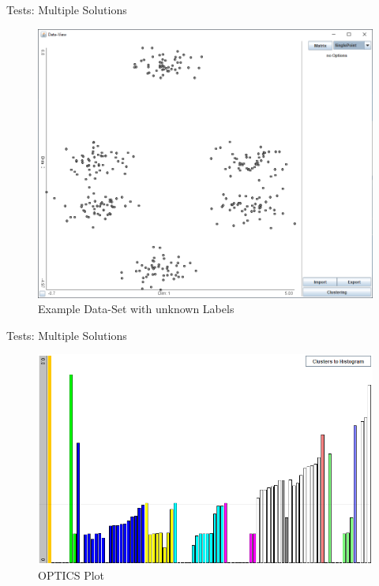 \documentclass[aspectratio=169]{beamer}
\begin{document}
\begin{frame}{Tests: Multiple Solutions}
	\begin{figure}[h]
		\centering
		\includegraphics[width=.64\textwidth]{multi}
		\caption{Example Data-Set with unknown Labels}
		\label{fig:multi}
	\end{figure}
\end{frame}


\begin{frame}{Tests: Multiple Solutions}
	\begin{figure}[h]
		\centering
		\includegraphics[width=.64\textwidth]{multi_optics}
		\caption{OPTICS Plot}
		\label{fig:multi_optics}
	\end{figure}
\end{frame}
\end{document}
